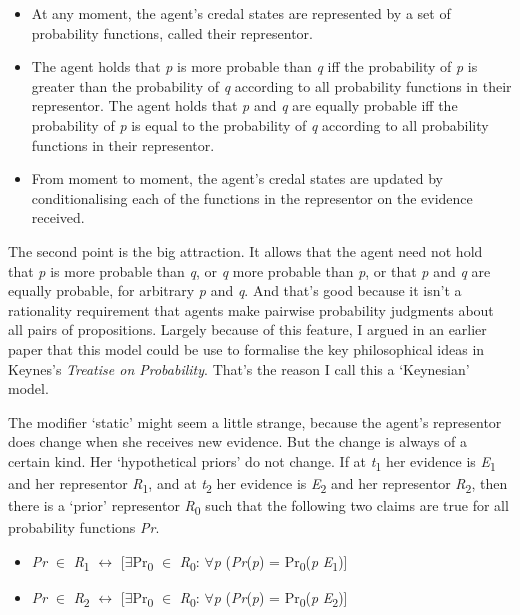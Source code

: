 \begin{itemize}
\item At any moment, the agent's credal states are represented by a set of probability functions, called their representor.
\item The agent holds that \textit{p} is more probable than \textit{q} iff the probability of \textit{p} is greater than the probability of \textit{q} according to all probability functions in their representor. The agent holds that \textit{p} and \textit{q} are equally probable iff the probability of \textit{p} is equal to the probability of \textit{q} according to all probability functions in their representor.
\item From moment to moment, the agent's credal states are updated by conditionalising each of the functions in the representor on the evidence received.
\end{itemize}

\noindent The second point is the big attraction. It allows that the agent need not hold that \textit{p} is more probable than \textit{q}, or \textit{q} more probable than \textit{p}, or that \textit{p} and \textit{q} are equally probable, for arbitrary \textit{p} and \textit{q}. And that's good because it isn't a rationality requirement that agents make pairwise probability judgments about all pairs of propositions. Largely because of this feature, I argued in an earlier paper that this model could be use to formalise the key philosophical ideas in Keynes's \textit{Treatise on Probability}. That's the reason I call this a `Keynesian' model.

The modifier `static' might seem a little strange, because the agent's representor does change when she receives new evidence. But the change is always of a certain kind. Her `hypothetical priors' do not change. If at \textit{t}\textsubscript{1} her evidence is \textit{E}\textsubscript{1} and her representor \textit{R}\textsubscript{1}, and at \textit{t}\textsubscript{2} her evidence is \textit{E}\textsubscript{2} and her representor \textit{R}\textsubscript{2}, then there is a `prior' representor \textit{R}\textsubscript{0} such that the following two claims are true for all probability functions \textit{Pr}.


\begin{itemize}
\item \textit{Pr} ${\in}$ \textit{R}\textsubscript{1} ${\leftrightarrow}$ [${\exists}$Pr\textsubscript{0} ${\in}$ \textit{R}\textsubscript{0}: ${\forall}$\textit{p} (\textit{Pr}(\textit{p}) = Pr\textsubscript{0}(\textit{p} {\textbar} \textit{E}\textsubscript{1})]
\item \textit{Pr} ${\in}$ \textit{R}\textsubscript{2} ${\leftrightarrow}$ [${\exists}$Pr\textsubscript{0} ${\in}$ \textit{R}\textsubscript{0}: ${\forall}$\textit{p} (\textit{Pr}(\textit{p}) = Pr\textsubscript{0}(\textit{p} {\textbar} \textit{E}\textsubscript{2})]
\end{itemize}

